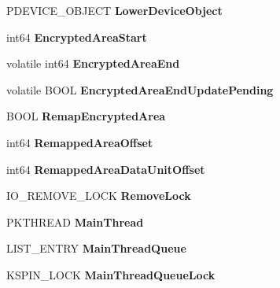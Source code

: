 \begin{DoxyCompactItemize}
P\+D\+E\+V\+I\+C\+E\+\_\+\+O\+B\+J\+E\+CT {\bfseries Lower\+Device\+Object}
\item 
\mbox{\label{struct_encrypted_io_queue_a501b74d79b9b03155bb6bf85002ae90d}} 
int64 {\bfseries Encrypted\+Area\+Start}
\item 
\mbox{\label{struct_encrypted_io_queue_a62ff1718115152d537c7688c292a1387}} 
volatile int64 {\bfseries Encrypted\+Area\+End}
\item 
\mbox{\label{struct_encrypted_io_queue_a99d075a42d7c0ccd3c2d4336bbee9750}} 
volatile B\+O\+OL {\bfseries Encrypted\+Area\+End\+Update\+Pending}
\item 
\mbox{\label{struct_encrypted_io_queue_acf5604ec4621bde4c2bf96a01dc6d6aa}} 
B\+O\+OL {\bfseries Remap\+Encrypted\+Area}
\item 
\mbox{\label{struct_encrypted_io_queue_a59983fc0adcf2ecaba7c1b6aa7637428}} 
int64 {\bfseries Remapped\+Area\+Offset}
\item 
\mbox{\label{struct_encrypted_io_queue_a969510e4a614cadf8efb69a107daf403}} 
int64 {\bfseries Remapped\+Area\+Data\+Unit\+Offset}
\item 
\mbox{\label{struct_encrypted_io_queue_a33839dcabad1fcce38435a96789b7531}} 
I\+O\+\_\+\+R\+E\+M\+O\+V\+E\+\_\+\+L\+O\+CK {\bfseries Remove\+Lock}
\item 
\mbox{\label{struct_encrypted_io_queue_a366c43e406f6cccdaefae539c01eb2bd}} 
P\+K\+T\+H\+R\+E\+AD {\bfseries Main\+Thread}
\item 
\mbox{\label{struct_encrypted_io_queue_ab84dac0bf6124005e3a019378af0d600}} 
L\+I\+S\+T\+\_\+\+E\+N\+T\+RY {\bfseries Main\+Thread\+Queue}
\item 
\mbox{\label{struct_encrypted_io_queue_a29dac44ab48d5dd4237a4ab06f063435}} 
K\+S\+P\+I\+N\+\_\+\+L\+O\+CK {\bfseries Main\+Thread\+Queue\+Lock}
\item 

\end{DoxyCompactItemize}
